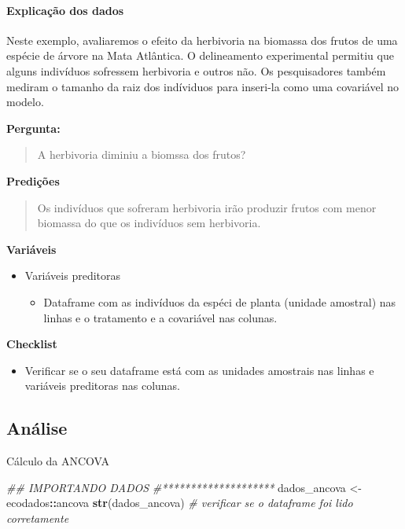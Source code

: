 \documentclass[
]{book}
\newenvironment{Shaded}{\begin{snugshade}}{\end{snugshade}}
\newcommand{\CommentTok}[1]{\textcolor[rgb]{0.56,0.35,0.01}{\textit{#1}}}
\newcommand{\KeywordTok}[1]{\textcolor[rgb]{0.13,0.29,0.53}{\textbf{#1}}}
\newcommand{\NormalTok}[1]{#1}
\newcommand{\OperatorTok}[1]{\textcolor[rgb]{0.81,0.36,0.00}{\textbf{#1}}}
\newcommand{\StringTok}[1]{\textcolor[rgb]{0.31,0.60,0.02}{#1}}
\providecommand{\tightlist}{%
  \setlength{\itemsep}{0pt}\setlength{\parskip}{0pt}}
\begin{document}
\hypertarget{explicauxe7uxe3o-dos-dados-9}{%
\paragraph{Explicação dos dados}\label{explicauxe7uxe3o-dos-dados-9}}

Neste exemplo, avaliaremos o efeito da herbivoria na biomassa dos frutos de uma espécie de árvore na Mata Atlântica. O delineamento experimental permitiu que alguns indivíduos sofressem herbivoria e outros não. Os pesquisadores também mediram o tamanho da raiz dos indíviduos para inseri-la como uma covariável no modelo.

\textbf{Pergunta:}

\begin{quote}
A herbivoria diminiu a biomssa dos frutos?
\end{quote}

\textbf{Predições}

\begin{quote}
Os indivíduos que sofreram herbivoria irão produzir frutos com menor biomassa do que os indivíduos sem herbivoria.
\end{quote}

\textbf{Variáveis}

\begin{itemize}
\tightlist
\item
  Variáveis preditoras

  \begin{itemize}
  \tightlist
  \item
    Dataframe com as indivíduos da espéci de planta (unidade amostral) nas linhas e o tratamento e a covariável nas colunas.
  \end{itemize}
\end{itemize}

\textbf{Checklist}

\begin{itemize}
\tightlist
\item
  Verificar se o seu dataframe está com as unidades amostrais nas linhas e variáveis preditoras nas colunas.
\end{itemize}

\hypertarget{anuxe1lise-9}{%
\subsection{Análise}\label{anuxe1lise-9}}

Cálculo da ANCOVA

\begin{Shaded}
\begin{Highlighting}[]
\CommentTok{## IMPORTANDO DADOS}
\CommentTok{#********************}
\NormalTok{dados_ancova <-}\StringTok{ }\NormalTok{ecodados}\OperatorTok{::}\NormalTok{ancova}
\KeywordTok{str}\NormalTok{(dados_ancova) }\CommentTok{# verificar se o dataframe foi lido corretamente}
\end{Highlighting}
\end{Shaded}
\end{document}
